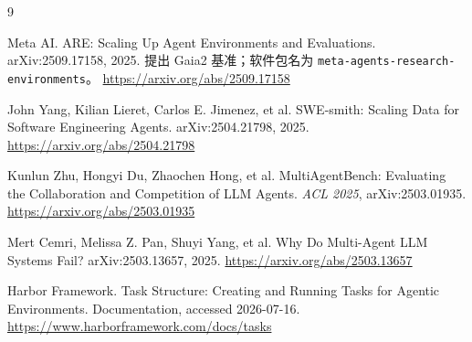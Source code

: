 \documentclass[UTF8,11pt,fontset=fandol]{ctexart}
\begin{document}
\begingroup
\scriptsize
\begin{thebibliography}{9}
\setlength{\itemsep}{0.05em}
\setlength{\parskip}{0pt}

Meta AI.
\newblock ARE: Scaling Up Agent Environments and Evaluations.
\newblock arXiv:2509.17158, 2025. 提出 Gaia2 基准；软件包名为 \texttt{meta-agents-research-environments}。
\newblock \url{https://arxiv.org/abs/2509.17158}

John Yang, Kilian Lieret, Carlos E. Jimenez, et al.
\newblock SWE-smith: Scaling Data for Software Engineering Agents.
\newblock arXiv:2504.21798, 2025.
\newblock \url{https://arxiv.org/abs/2504.21798}

Kunlun Zhu, Hongyi Du, Zhaochen Hong, et al.
\newblock MultiAgentBench: Evaluating the Collaboration and Competition of LLM Agents.
\newblock \emph{ACL 2025}, arXiv:2503.01935.
\newblock \url{https://arxiv.org/abs/2503.01935}

Mert Cemri, Melissa Z. Pan, Shuyi Yang, et al.
\newblock Why Do Multi-Agent LLM Systems Fail?
\newblock arXiv:2503.13657, 2025.
\newblock \url{https://arxiv.org/abs/2503.13657}

Harbor Framework.
\newblock Task Structure: Creating and Running Tasks for Agentic Environments.
\newblock Documentation, accessed 2026-07-16.
\newblock \url{https://www.harborframework.com/docs/tasks}

\end{thebibliography}
\endgroup
\end{document}
